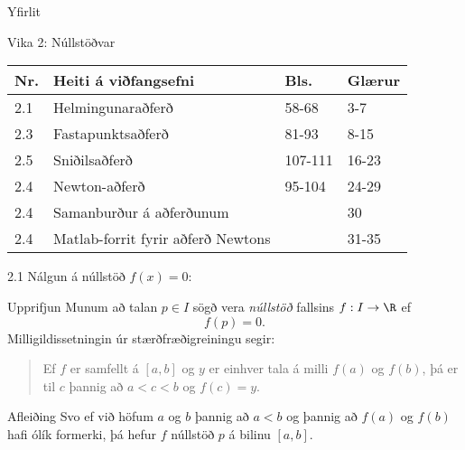 \date{17.~og 22.~janúar 2014}



\begin{frame}
	\maketitle
\end{frame}

\section*{}
\begin{frame}{Yfirlit}
\begin{block}{Vika 2: Núllstöðvar}
\begin{center}
\begin{tabular}{|l|l|l|l|}\hline
Nr. &Heiti á viðfangsefni & Bls. & Glærur\\
\hline
2.1 & Helmingunaraðferð& 58-68 & 3-7\\
2.3 & Fastapunktsaðferð& 81-93 & 8-15\\
2.5 & Sniðilsaðferð& 107-111 & 16-23\\
2.4 & Newton-aðferð& 95-104 & 24-29\\
2.4 & Samanburður á aðferðunum & & 30\\
2.4 & Matlab-forrit fyrir aðferð Newtons & & 31-35 \\
\hline
\end{tabular}
\end{center}

\end{block}
\end{frame}

\begin{frame}{2.1 Nálgun á núllstöð  $f(x)=0$:} 

\begin{block}{Upprifjun}
Munum að talan  $p\in I$ sögð vera {\it núllstöð} fallsins $f:I\to \R$ ef
\begin{equation*}
	f(p)=0.
\end{equation*}\pause
Milligildissetningin úr stærðfræðigreiningu segir: 
\begin{quote}
	Ef $f$ er samfellt á $[a,b]$ og $y$ er einhver tala á milli $f(a)$ og $f(b)$, þá er til $c$ þannig að $a < c < b$ og $f(c) = y$.
\end{quote}
\end{block} 
\pause

\begin{block}{Afleiðing}
Svo ef við höfum $a$ og $b$ þannig að $a < b$ og þannig að
$f(a)$ og $f(b)$ hafi ólík formerki, þá hefur $f$ núllstöð $p$ á bilinu
$[a,b]$.
\end{block}
\end{frame}

